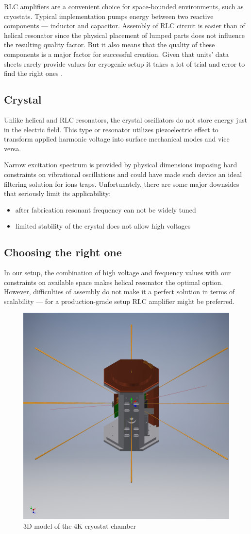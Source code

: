 RLC amplifiers are a convenient choice for space-bounded environments, such as cryostats. Typical implementation pumps energy between two reactive components --- inductor and capacitor. Assembly of RLC circuit is easier than of helical resonator since the physical placement of lumped parts does not influence the resulting quality factor. But it also means that the quality of these components is a major factor for successful creation. Given that units' data sheets rarely provide values for cryogenic setup it takes a lot of trial and error to find the right ones \cite{Gandolfi2010}.
\subsection{Crystal}
Unlike helical and RLC resonators, the crystal oscillators do not store energy just in the electric field. This type or resonator utilizes piezoelectric effect to transform applied harmonic voltage into surface mechanical modes and vice versa.

Narrow excitation spectrum is provided by physical dimensions imposing hard constraints on vibrational oscillations and could have made such device an ideal filtering solution for ions traps. Unfortunately, there are some major downsides that seriously limit its applicability:
\begin{itemize}
	\item after fabrication resonant frequency can not be widely tuned
	\item limited stability of the crystal does not allow high voltages
\end{itemize}
\subsection{Choosing the right one}
In our setup, the combination of high voltage and frequency values with our constraints on available space makes helical resonator the optimal option. However, difficulties of assembly do not make it a perfect solution in terms of scalability --- for a production-grade setup RLC amplifier might be preferred.

\begin{figure}[h]
	\includegraphics[width=\textwidth]{images/4K_chamber}
	\caption{3D model of the 4K cryostat chamber}
	\label{fig:4K_chamber}
\end{figure}